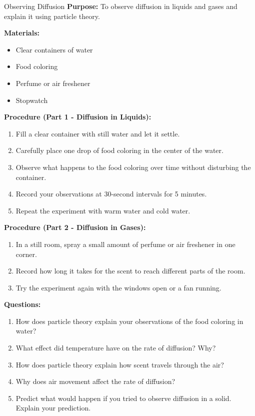\begin{investigation}{Observing Diffusion}
\textbf{Purpose:} To observe diffusion in liquids and gases and explain it using particle theory.

\textbf{Materials:}
\begin{itemize}
    \item Clear containers of water
    \item Food coloring
    \item Perfume or air freshener
    \item Stopwatch
\end{itemize}

\textbf{Procedure (Part 1 - Diffusion in Liquids):}
\begin{enumerate}
    \item Fill a clear container with still water and let it settle.
    \item Carefully place one drop of food coloring in the center of the water.
    \item Observe what happens to the food coloring over time without disturbing the container.
    \item Record your observations at 30-second intervals for 5 minutes.
    \item Repeat the experiment with warm water and cold water.
\end{enumerate}

\textbf{Procedure (Part 2 - Diffusion in Gases):}
\begin{enumerate}
    \item In a still room, spray a small amount of perfume or air freshener in one corner.
    \item Record how long it takes for the scent to reach different parts of the room.
    \item Try the experiment again with the windows open or a fan running.
\end{enumerate}

\textbf{Questions:}
\begin{enumerate}
    \item How does particle theory explain your observations of the food coloring in water?
    \item What effect did temperature have on the rate of diffusion? Why?
    \item How does particle theory explain how scent travels through the air?
    \item Why does air movement affect the rate of diffusion?
    \item Predict what would happen if you tried to observe diffusion in a solid. Explain your prediction.
\end{enumerate}
\end{investigation}

